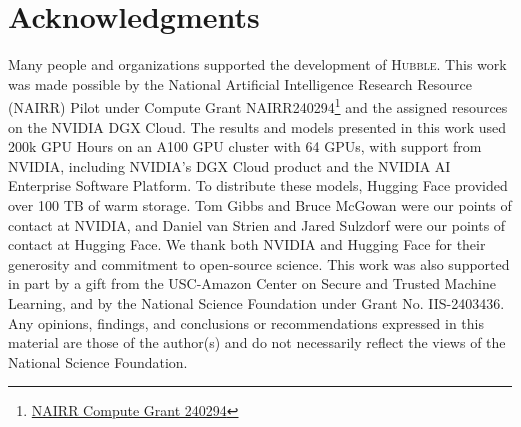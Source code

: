 \documentclass{article} %
\begin{document}



\section*{Acknowledgments}

Many people and organizations supported the development of \textsc{Hubble}. 
This work was made possible by the National Artificial Intelligence Research Resource (NAIRR) Pilot under Compute Grant NAIRR240294\footnote{\href{https://nairrpilot.org/projects/awarded?_requestNumber=NAIRR240294}{NAIRR Compute Grant 240294}} and the assigned resources on the NVIDIA DGX Cloud. The results and models presented in this work used 200k GPU Hours on an A100 GPU cluster with 64 GPUs, with support from NVIDIA, including NVIDIA's DGX Cloud product and the NVIDIA AI Enterprise Software Platform.
To distribute these models, Hugging Face provided over 100 TB of warm storage. Tom Gibbs and Bruce McGowan were our points of contact at NVIDIA, and Daniel van Strien and Jared Sulzdorf were our points of contact at Hugging Face. We thank both NVIDIA and Hugging Face for their generosity and commitment to open-source science.
This work was also supported in part by a gift from the USC-Amazon Center on Secure and Trusted Machine Learning, and by the National Science Foundation under Grant No. IIS-2403436. Any opinions, findings, and conclusions or recommendations expressed in this material are those of the author(s) and do not necessarily reflect the views of the National Science Foundation.
\end{document}

